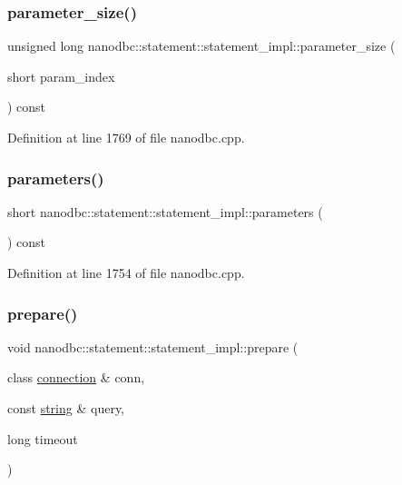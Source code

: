\subsubsection{\texorpdfstring{parameter\_size()}{parameter\_size()}}
{\footnotesize\ttfamily unsigned long nanodbc\+::statement\+::statement\+\_\+impl\+::parameter\+\_\+size (\begin{DoxyParamCaption}\item[{short}]{param\+\_\+index }\end{DoxyParamCaption}) const\hspace{0.3cm}{\ttfamily [inline]}}



Definition at line 1769 of file nanodbc.\+cpp.

\mbox{\label{classnanodbc_1_1statement_1_1statement__impl_a98a450f97e5bedb6b43151c199ff07ca}} 
\subsubsection{\texorpdfstring{parameters()}{parameters()}}
{\footnotesize\ttfamily short nanodbc\+::statement\+::statement\+\_\+impl\+::parameters (\begin{DoxyParamCaption}{ }\end{DoxyParamCaption}) const\hspace{0.3cm}{\ttfamily [inline]}}



Definition at line 1754 of file nanodbc.\+cpp.

\mbox{\label{classnanodbc_1_1statement_1_1statement__impl_a7d93dd08169247d9c2462686b79dccd7}} 
\subsubsection{\texorpdfstring{prepare()}{prepare()}\hspace{0.1cm}{\footnotesize\ttfamily [1/2]}}
{\footnotesize\ttfamily void nanodbc\+::statement\+::statement\+\_\+impl\+::prepare (\begin{DoxyParamCaption}\item[{class \mbox{\hyperlink{classnanodbc_1_1connection}{connection}} \&}]{conn,  }\item[{const \mbox{\hyperlink{namespacenanodbc_abfc0ece56278e590911ec8352774c212}{string}} \&}]{query,  }\item[{long}]{timeout }\end{DoxyParamCaption})\hspace{0.3cm}{\ttfamily [inline]}}



